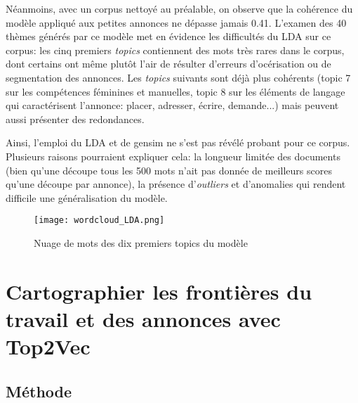 Néanmoins, avec un corpus nettoyé au préalable, on observe que la cohérence du modèle appliqué aux petites annonces ne dépasse jamais 0.41. L'examen des 40 thèmes générés par ce modèle met en évidence les difficultés du LDA sur ce corpus: les cinq premiers \textit{topics} contiennent des mots très rares dans le corpus, dont certains ont même plutôt l'air de résulter d'erreurs d'océrisation ou de segmentation des annonces. Les \textit{topics} suivants sont déjà plus cohérents (topic 7 sur les compétences féminines et manuelles, topic 8 sur les éléments de langage qui caractérisent l'annonce: placer, adresser, écrire, demande...) mais peuvent aussi présenter des redondances.

Ainsi, l'emploi du LDA et de gensim ne s'est pas révélé probant pour ce corpus. Plusieurs raisons pourraient expliquer cela: la longueur limitée des documents (bien qu'une découpe tous les 500 mots n'ait pas donnée de meilleurs scores qu'une découpe par annonce), la présence d'\textit{outliers} et d'anomalies qui rendent difficile une généralisation du modèle. 

\begin{figure}[ht]
	\centering
	\texttt{[image: wordcloud\_LDA.png]}
	\caption{Nuage de mots des dix premiers topics du modèle}
\end{figure}




\chapter{Cartographier les frontières du travail et des annonces avec Top2Vec}

\section{Méthode}

